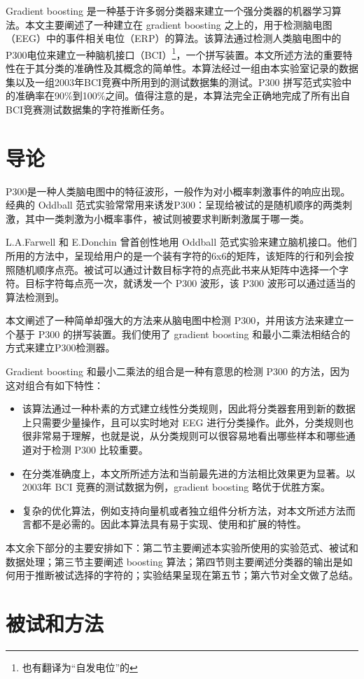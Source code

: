 \documentclass[a4paper]{ecusttrans}
\begin{document}
  \setlength{\parindent}{2em}

  \begin{cAbstract}
  Gradient boosting 是一种基于许多弱分类器来建立一个强分类器的机器学习算法。本文主要阐述了一种建立在 gradient boosting 之上的，用于检测脑电图（EEG）中的事件相关电位（ERP）的算法。该算法通过检测人类脑电图中的P300电位来建立一种脑机接口（BCI）\footnote{也有翻译为{“自发电位”}的}，一个拼写装置。本文所述方法的重要特性在于其分类的准确性及其概念的简单性。本算法经过一组由本实验室记录的数据集以及一组2003年BCI竞赛中所用到的测试数据集的测试。P300 拼写范式实验中的准确率在90\%到100\%之间。值得注意的是，本算法完全正确地完成了所有出自BCI竞赛测试数据集的字符推断任务。

  \end{cAbstract}

  \wuhao
  \section{导论}
  P300是一种人类脑电图中的特征波形，一般作为对小概率刺激事件的响应出现。经典的 Oddball 范式实验常常用来诱发P300：呈现给被试的是随机顺序的两类刺激，其中一类刺激为小概率事件，被试则被要求判断刺激属于哪一类。

  L.A.Farwell 和 E.Donchin 曾首创性地用 Oddball 范式实验来建立脑机接口。他们所用的方法中，呈现给用户的是一个装有字符的6x6的矩阵，该矩阵的行和列会按照随机顺序点亮。被试可以通过计数目标字符的点亮此书来从矩阵中选择一个字符。目标字符每点亮一次，就诱发一个 P300 波形，该 P300 波形可以通过适当的算法检测到。

  本文阐述了一种简单却强大的方法来从脑电图中检测 P300，并用该方法来建立一个基于 P300 的拼写装置。我们使用了 gradient boosting 和最小二乘法相结合的方式来建立P300检测器。

  Gradient boosting 和最小二乘法的组合是一种有意思的检测 P300 的方法，因为这对组合有如下特性：

  \begin{itemize}
    \item 该算法通过一种朴素的方式建立线性分类规则，因此将分类器套用到新的数据上只需要少量操作，且可以实时地对 EEG 进行分类操作。此外，分类规则也很非常易于理解，也就是说，从分类规则可以很容易地看出哪些样本和哪些通道对于检测 P300 比较重要。
    \item 在分类准确度上，本文所所述方法和当前最先进的方法相比效果更为显著。以2003年 BCI 竞赛的测试数据为例，gradient boosting 略优于优胜方案。
    \item 复杂的优化算法，例如支持向量机或者独立组件分析方法，对本文所述方法而言都不是必需的。因此本算法具有易于实现、使用和扩展的特性。
  \end{itemize}

  本文余下部分的主要安排如下：第二节主要阐述本实验所使用的实验范式、被试和数据处理；第三节主要阐述 boosting 算法；第四节则主要阐述分类器的输出是如何用于推断被试选择的字符的；实验结果呈现在第五节；第六节对全文做了总结。
  \section{被试和方法}
\end{document}
